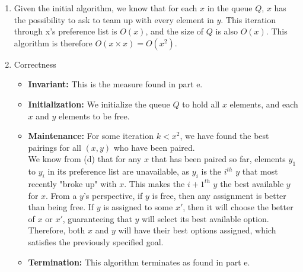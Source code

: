 \documentclass{article}
\begin{document}
\begin{enumerate}
\begin{enumerate}
        \item Given the initial algorithm, we know that for each $x$ in the queue $Q$, $x$ has the possibility to ask 
        to team up with every element in $y$. This iteration through x's preference list is $O\left(x\right)$, and the 
        size of $Q$ is also $O\left(x\right)$. This algorithm is therefore $O\left(x \times x\right) = 
        O\left(x^2\right)$.
        
        \item Correctness
            \begin{itemize}
                \item \textbf{Invariant:} This is the measure found in part e.
                \item \textbf{Initialization:} We initialize the queue $Q$ to hold all $x$ elements, and each $x$ and
                    $y$ elements to be free.
                \item \textbf{Maintenance:} For some iteration $k < x^2$, we have found the best pairings
                    for all $(x, y)$ who have been paired.   \\
                    
                    We know from (d) that for any $x$ that has been paired so far, elements $y_1$ to $y_i$ in its preference list are unavailable, as $y_i$ is the $i^{th}$ $y$ that most recently "broke up" with $x$. This makes the $i + 1^{th}$ $y$ the best available $y$ for $x$. From a $y$'s perspective, if $y$ is free, then any assignment is better than being free. If $y$ is assigned to some $x'$, then it will choose the better of $x$ or $x'$, guaranteeing that $y$ will select its best available option.\\
                    
                    Therefore, both $x$ and $y$ will have their best options assigned, which satisfies the previously specified goal.
                    
                \item \textbf{Termination:} This algorithm terminates as found in part e.
            \end{itemize}
        \end{enumerate}
\end{enumerate}
\end{document}
